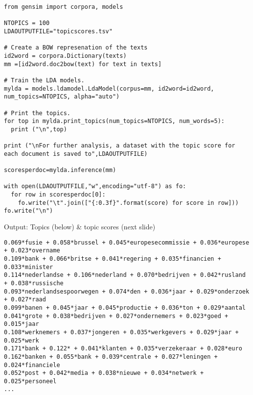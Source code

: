 \documentclass[compress]{beamer}
\begin{document}
\begin{frame}
\begin{lstlisting}
from gensim import corpora, models

NTOPICS = 100
LDAOUTPUTFILE="topicscores.tsv"

# Create a BOW represenation of the texts
id2word = corpora.Dictionary(texts)
mm =[id2word.doc2bow(text) for text in texts]

# Train the LDA models.
mylda = models.ldamodel.LdaModel(corpus=mm, id2word=id2word, num_topics=NTOPICS, alpha="auto")

# Print the topics.
for top in mylda.print_topics(num_topics=NTOPICS, num_words=5):
  print ("\n",top)

print ("\nFor further analysis, a dataset with the topic score for each document is saved to",LDAOUTPUTFILE)

scoresperdoc=mylda.inference(mm)

with open(LDAOUTPUTFILE,"w",encoding="utf-8") as fo:
  for row in scoresperdoc[0]:
    fo.write("\t".join(["{:0.3f}".format(score) for score in row]))
fo.write("\n")
\end{lstlisting}

\end{frame}


\begin{frame}[fragile]{Output: Topics (below) \& topic scores (next slide)}
\begin{lstlisting}
0.069*fusie + 0.058*brussel + 0.045*europesecommissie + 0.036*europese + 0.023*overname
0.109*bank + 0.066*britse + 0.041*regering + 0.035*financien + 0.033*minister
0.114*nederlandse + 0.106*nederland + 0.070*bedrijven + 0.042*rusland + 0.038*russische
0.093*nederlandsespoorwegen + 0.074*den + 0.036*jaar + 0.029*onderzoek + 0.027*raad
0.099*banen + 0.045*jaar + 0.045*productie + 0.036*ton + 0.029*aantal
0.041*grote + 0.038*bedrijven + 0.027*ondernemers + 0.023*goed + 0.015*jaar
0.108*werknemers + 0.037*jongeren + 0.035*werkgevers + 0.029*jaar + 0.025*werk
0.171*bank + 0.122* + 0.041*klanten + 0.035*verzekeraar + 0.028*euro
0.162*banken + 0.055*bank + 0.039*centrale + 0.027*leningen + 0.024*financiele
0.052*post + 0.042*media + 0.038*nieuwe + 0.034*netwerk + 0.025*personeel
...
\end{lstlisting}
\end{frame}


\begin{frame}[plain]
\end{frame}
\end{document}
